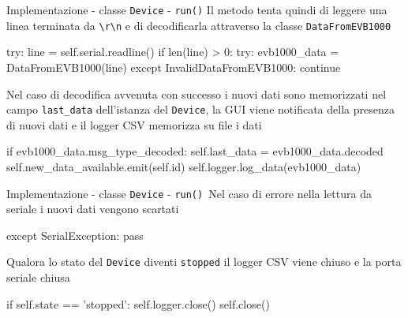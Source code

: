   
\begin{frame}[fragile, shrink=20]{Implementazione - classe \lstinline!Device! - \lstinline!run()!}
  Il metodo tenta quindi di leggere una linea terminata da \lstinline!\r\n!
  e di decodificarla attraverso la classe \lstinline!DataFromEVB1000!
  \begin{Python}
           try:
                line = self.serial.readline()
                if len(line) > 0:
                    try:
                        evb1000_data = DataFromEVB1000(line)
                    except InvalidDataFromEVB1000:
                        continue
  \end{Python}
  Nel caso di decodifica avvenuta con successo i nuovi dati sono memorizzati
  nel campo \lstinline!last_data! dell'istanza del \lstinline!Device!, la GUI
  viene notificata della presenza di nuovi dati e il logger CSV memorizza su file i dati
    \begin{Python}
                    if evb1000_data.msg_type_decoded:
                        self.last_data = evb1000_data.decoded
                        self.new_data_available.emit(self.id)
                        self.logger.log_data(evb1000_data)
    \end{Python}
\end{frame}

\begin{frame}[fragile, shrink=20]{Implementazione - classe \lstinline!Device! - \lstinline!run()!}\
  Nel caso di errore nella lettura da seriale i nuovi dati vengono scartati
  \begin{Python}
            except SerialException:
                pass
  \end{Python}

  Qualora lo stato del \lstinline!Device! diventi \lstinline!stopped!
  il logger CSV viene chiuso e la porta seriale chiusa
  \begin{Python}
        if self.state == 'stopped':
            self.logger.close()
            self.close()

  \end{Python}
\end{frame}

